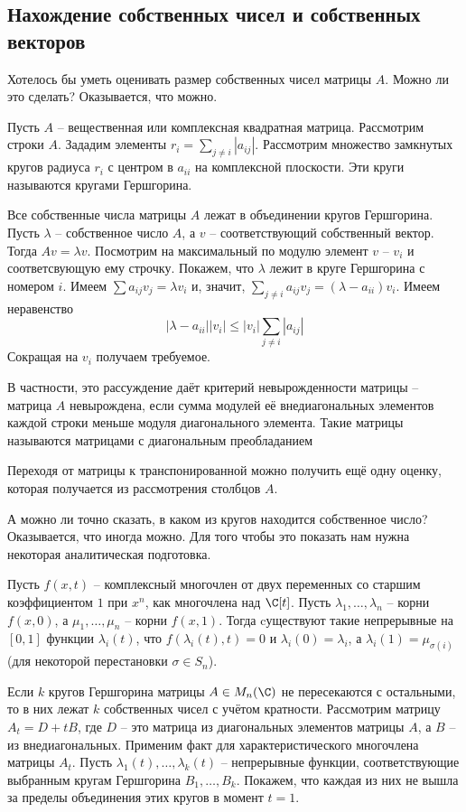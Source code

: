 \subsection{Нахождение собственных чисел и собственных векторов}

Хотелось бы уметь оценивать размер собственных чисел матрицы $A$. Можно ли это сделать? Оказывается, что можно. 


Пусть $A$ -- вещественная или комплексная квадратная матрица. Рассмотрим строки $A$. Зададим элементы $r_i=\sum_{j\neq i} |a_{ij}|$. Рассмотрим множество замкнутых кругов радиуса $r_i$ с центром в $a_{ii}$ на комплексной плоскости. Эти круги называются кругами Гершгорина. 

\thrm Все собственные числа матрицы $A$ лежат в объединении кругов Гершгорина. 
\ethrm
\proof Пусть $\lambda$ -- собственное число $A$, а $v$ -- соответствующий собственный вектор. Тогда $Av=\lambda v$. Посмотрим на максимальный по модулю элемент $v$ -- $v_i$ и соответсвующую ему строчку. Покажем, что $\lambda$ лежит в круге Гершгорина с номером $i$. Имеем $\sum a_{ij}v_j =\lambda v_i$  и, значит, $\sum_{j\neq i} a_{ij}v_j= (\lambda - a_{ii})v_i $. Имеем неравенство $$|\lambda -a_{ii}||v_i| \leq |v_i|\sum_{j\neq i} |a_{ij}|$$
Сокращая на $v_i$ получаем требуемое. 
\endproof

\rm В частности, это рассуждение даёт критерий невырожденности матрицы -- матрица $A$ невырождена, если сумма модулей её внедиагональных элементов каждой строки меньше модуля диагонального элемента. Такие матрицы называются матрицами с диагональным преобладанием
\erm

\rm
Переходя от матрицы к транспонированной можно получить ещё одну оценку, которая получается из рассмотрения столбцов $A$.
\erm

А можно ли точно сказать, в каком из кругов находится собственное число? Оказывается, что иногда можно. Для того чтобы это показать нам нужна некоторая аналитическая подготовка.

 Пусть $f(x,t)$ -- комплексный многочлен от двух переменных со старшим коэффициентом $1$ при $x^n$, как многочлена над $\C[t]$. Пусть $\lambda_1,\dots,\lambda_n$ -- корни $f(x,0)$, а $\mu_1,\dots, \mu_n$ -- корни $f(x,1)$. Тогда cуществуют такие непрерывные на $[0,1]$ функции $\lambda_i(t)$, что $f(\lambda_i(t),t)=0$ и $\lambda_i(0)=\lambda_i$, а $\lambda_i(1)=\mu_{\sigma(i)}$ (для некоторой перестановки $\sigma \in S_n$).
\efct

\thrm Если $k$ кругов Гершгорина матрицы $A\in M_n(\C)$ не пересекаются с остальными, то в них лежат $k$ собственных чисел с учётом кратности.
\ethrm
\proof Рассмотрим матрицу $A_t= D+ tB$, где $D$ -- это матрица из диагональных элементов матрицы $A$, а $B$ -- из внедиагональных. Применим факт для характеристического многочлена матрицы $A_t$. Пусть  $\lambda_1(t),\dots,\lambda_k(t)$ -- непрерывные функции, соответствующие выбранным кругам Гершгорина $B_1,\dots,B_k$. Покажем, что каждая из них не вышла за пределы объединения этих кругов в момент $t=1$. 

